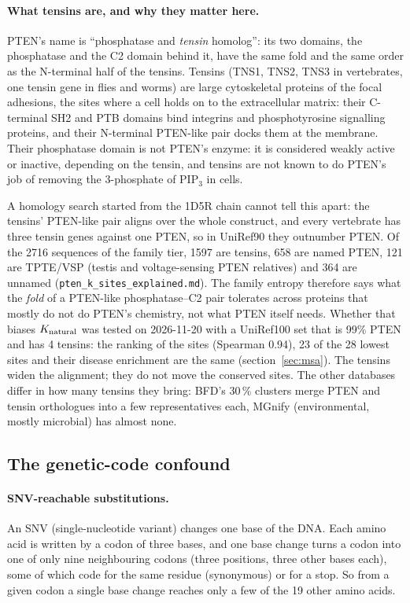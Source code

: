 \documentclass[11pt,a4paper]{article}
\newcommand{\file}[1]{\texttt{#1}}
\begin{document}
\paragraph{What tensins are, and why they matter here.} PTEN's name is
``phosphatase and \emph{tensin} homolog'': its two domains, the phosphatase
and the C2 domain behind it, have the same fold and the same order as the
N-terminal half of the tensins. Tensins (TNS1, TNS2, TNS3 in vertebrates, one
tensin gene in flies and worms) are large cytoskeletal proteins of the focal
adhesions, the sites where a cell holds on to the extracellular matrix: their
C-terminal SH2 and PTB domains bind integrins and phosphotyrosine signalling
proteins, and their N-terminal PTEN-like pair docks them at the membrane.
Their phosphatase domain is not PTEN's enzyme: it is considered weakly
active or inactive, depending on the tensin, and tensins are not known to do
PTEN's job of removing the 3-phosphate of PIP$_3$ in cells.

A homology search started from the 1D5R chain cannot tell this apart: the
tensins' PTEN-like pair aligns over the whole construct, and every vertebrate
has three tensin genes against one PTEN, so in UniRef90 they outnumber PTEN.
Of the 2716 sequences of the family tier, 1597 are tensins, 658 are named PTEN,
121 are TPTE/VSP (testis and voltage-sensing PTEN relatives) and 364 are
unnamed (\file{pten\_k\_sites\_explained.md}). The family entropy therefore
says what the \emph{fold} of a PTEN-like phosphatase--C2 pair tolerates across
proteins that mostly do not do PTEN's chemistry, not what PTEN itself needs.
Whether that biases $K_{\rm natural}$ was tested on 2026-11-20 with a UniRef100
set that is 99\% PTEN and has 4 tensins: the ranking of the sites (Spearman
0.94), 23 of the 28 lowest sites and their disease enrichment are the same
(section~\ref{sec:msa}). The tensins widen the alignment; they do not move
the conserved sites. The other databases differ in how many tensins they
bring: BFD's 30\,\% clusters merge PTEN and tensin orthologues into a few
representatives each, MGnify (environmental, mostly microbial) has almost none.

\subsection{The genetic-code confound}\label{sec:gencode}

\paragraph{SNV-reachable substitutions.} An SNV (single-nucleotide
variant) changes one base of the DNA. Each amino acid is written by a codon of
three bases, and one base change turns a codon into one of only nine
neighbouring codons (three positions, three other bases each), some of which
code for the same residue (synonymous) or for a stop. So from a given codon a
single base change reaches only a few of the 19 other amino acids.
\end{document}
